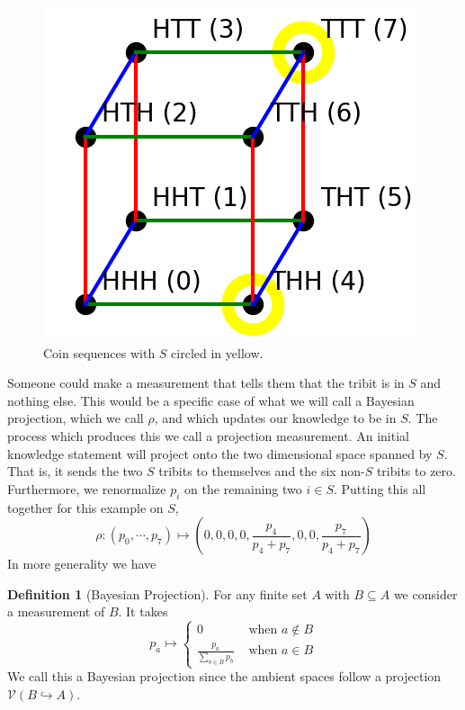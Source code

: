 \documentclass[12pt,a4paper]{article}
\theoremstyle{myrule}
\theoremstyle{postulate}
\theoremstyle{definition}
\newtheorem{definition}{Definition}[section]
\begin{document}
\begin{figure}[h]
\centering
\includegraphics[scale=0.6]{cube.png}
\caption{Coin sequences with $S$ circled in yellow.}
\end{figure}

Someone could make a measurement that tells them that the tribit is in $S$ and nothing else.  This would be a specific case of what we will call a Bayesian projection, which we call $\rho$, and which updates our knowledge to be in $S$.  The process which produces this we call a projection measurement.  An initial knowledge statement will project onto the two dimensional space spanned by $S$.  That is, it sends the two $S$ tribits to themselves and the six non-$S$ tribits to zero.  Furthermore, we renormalize $p_i$ on the remaining two $i \in S$.  Putting this all together for this example on $S$, 
\begin{equation}
\label{sdist}
\rho: (p_0,\cdots,p_7) \mapsto \left(0,0,0,0, \frac{p_4}{p_4 + p_7},0,0,\frac{p_7}{p_4 + p_7}\right)
\end{equation}
In more generality we have
\begin{definition}[Bayesian Projection]
\label{projdef}
For any finite set $A$ with $B \subseteq A$ we consider a measurement of $B$.  It takes
\[
p_a \mapsto \left\{ \begin{array}{cc} 0 &\text{ when } a \not \in B \\ \frac{p_a}{\sum_{b \in B} p_b} & \text{ when } a \in B \end{array} \right.
\]
We call this a Bayesian projection since the ambient spaces follow a projection $\mathcal{V}(B \hookrightarrow A)$.
\end{definition}
\end{document}
